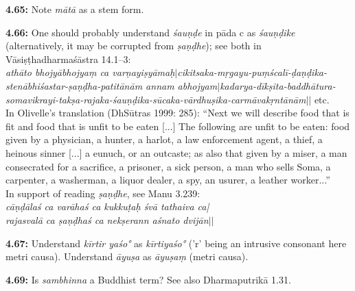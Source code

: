 \documentclass{article}
\newcommand{\vsnum}[1]{\textbf{#1}}
\newcommand{\skt}[1]{\textit{#1}}
\begin{document}
\vsnum{4.65: }Note \skt{mātā} as a stem form.

\vsnum{4.66: }One should probably understand \skt{śauṇḍe} in pāda c as \skt{śauṇḍike} (alternatively, it may be corrupted from \skt{ṣaṇḍhe}); see both in Vāsiṣṭhadharmaśāstra 14.1--3: \\ \textit{athāto bhojyābhojyaṃ ca varṇayiṣyāmaḥ$|$cikitsaka-mṛgayu-puṃścalī-ḍaṇḍika-stenābhiśastar-ṣaṇḍha-patitānām annam abhojyam$|$kadarya-dīkṣita-baddhātura-somavikrayi-takṣa-rajaka-śauṇḍika-sūcaka-vārdhuṣika-carmāvakṛntānām$||$} etc. \\ In Olivelle's translation (DhSūtras 1999: 285): ``Next we will describe food that is fit and food that is unfit to be eaten [...] The following are unfit to be eaten: food given by a physician, a hunter, a harlot, a law enforcement agent, a thief, a heinous sinner [...] a eunuch, or an outcaste; as also that given by a miser, a man consecrated for a sacrifice, a prisoner, a sick person, a man who sells Soma, a carpenter, a washerman, a liquor dealer, a spy, an usurer, a leather worker...'' \\ In support of reading \skt{ṣaṇḍhe}, see Manu 3.239: \\ \textit{cāṇḍālaś ca varāhaś ca kukkuṭaḥ śvā tathaiva ca|\\ rajasvalā ca ṣaṇḍhaś ca nekṣerann aśnato dvijān$||$}

\vsnum{4.67: }Understand \skt{kīrtir yaśo°} as \skt{kīrtiyaśo°} ('r' being an intrusive consonant here metri causa). Understand \skt{āyuṣa} as \skt{āyuṣaṃ} (metri causa).

\vsnum{4.69: }Is \skt{sambhinna} a Buddhist term? See also Dharmaputrikā 1.31.
\end{document}
